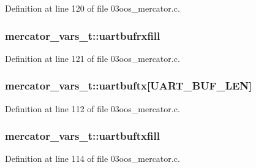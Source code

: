 Definition at line 120 of file 03oos\+\_\+mercator.\+c.

\subsubsection[{\texorpdfstring{uartbufrxfill}{uartbufrxfill}}]{ mercator\+\_\+vars\+\_\+t\+::uartbufrxfill}\hypertarget{structmercator__vars__t_a5fef3d93c612d3dbe4c7ddd252d79466}{}\label{structmercator__vars__t_a5fef3d93c612d3dbe4c7ddd252d79466}


Definition at line 121 of file 03oos\+\_\+mercator.\+c.

\subsubsection[{\texorpdfstring{uartbuftx}{uartbuftx}}]{ mercator\+\_\+vars\+\_\+t\+::uartbuftx\mbox{[}{\bf U\+A\+R\+T\+\_\+\+B\+U\+F\+\_\+\+L\+EN}\mbox{]}}\hypertarget{structmercator__vars__t_ae402a347ac5cfd93a074eac22b4861de}{}\label{structmercator__vars__t_ae402a347ac5cfd93a074eac22b4861de}


Definition at line 112 of file 03oos\+\_\+mercator.\+c.

\subsubsection[{\texorpdfstring{uartbuftxfill}{uartbuftxfill}}]{ mercator\+\_\+vars\+\_\+t\+::uartbuftxfill}\hypertarget{structmercator__vars__t_a2892b4d4768c2b75f2895314b73a6df7}{}\label{structmercator__vars__t_a2892b4d4768c2b75f2895314b73a6df7}


Definition at line 114 of file 03oos\+\_\+mercator.\+c.

